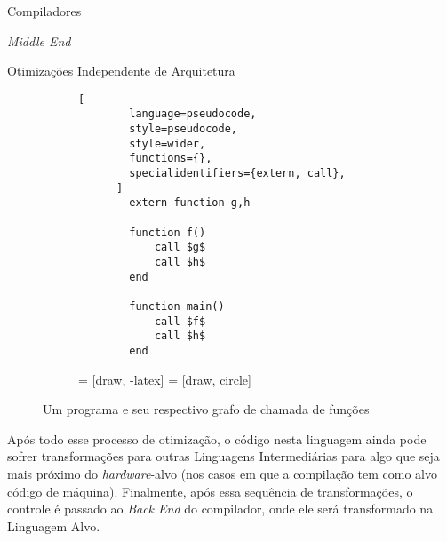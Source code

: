 \begin{section}{Compiladores}
\begin{subsection}{\textit{Middle End}}
\begin{subsubsection}{Otimizações Independente de Arquitetura}
\begin{figure}[ht]
\centering
  \begin{subfigure}[b]{0.40\textwidth}
      \begin{lstlisting}[
        language=pseudocode,
        style=pseudocode,
        style=wider,
        functions={},
        specialidentifiers={extern, call},
      ]
        extern function g,h

        function f()
            call $g$
            call $h$
        end

        function main()
            call $f$
            call $h$
        end
      \end{lstlisting}
  \end{subfigure}
  \begin{subfigure}[b]{0.40\textwidth}
     = [draw, -latex]
     = [draw, circle]
    \begin{center}
    \end{center}
  \end{subfigure}
  \caption{Um programa e seu respectivo grafo de chamada de funções}
  \label{fig:call_graph}
\end{figure}
    Após todo esse processo de otimização, o código nesta linguagem ainda
pode sofrer transformações para outras Linguagens
Intermediárias para algo que seja mais próximo do
\textit{hardware}-alvo (nos casos em que a compilação tem como alvo código de máquina).
Finalmente, após essa sequência de transformações, o controle é
passado ao \textit{Back End} do compilador, onde ele será transformado na
Linguagem Alvo.

\end{subsubsection}

\end{subsection}


\end{section}
